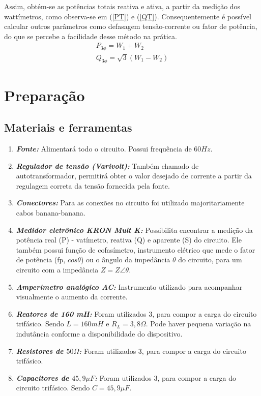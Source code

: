 \documentclass[a4paper,12pt,oneside,openany,table,xcdraw]{article}
\begin{document}
Assim, obtém-se as potências totais reativa e ativa, a partir da medição dos wattímetros, como observa-se em (\ref{PT}) e (\ref{QT}). Consequentemente é possível calcular outros parâmetros como defasagem tensão-corrente ou fator de potência, do que se percebe a facilidade desse método na prática.
\begin{gather}
P_{3\phi} = W_1 + W_2\label{PT}\\
Q_{3\phi} = \sqrt{3}(W_1 - W_2)\label{QT}
\end{gather}


\section{Preparação}
\subsection{Materiais e ferramentas} %
\begin{enumerate}[1 -]
\item \emph{\textbf{Fonte:}}
Alimentará todo o circuito. Possui frequência de $60Hz$.

\item \emph{\textbf{Regulador de tensão (Varivolt):}}
Também chamado de autotransformador, permitirá obter o valor desejado de corrente a partir da regulagem correta da tensão fornecida pela fonte.

\item \emph{\textbf{Conectores:}}
Para as conexões no circuito foi utilizado majoritariamente cabos banana-banana.

\item \emph{\textbf{Medidor eletrônico KRON Mult K:}}
Possibilita encontrar a medição da potência real (P) - vatímetro, reativa (Q) e aparente (S) do circuito. Ele também possui função de cofasímetro, instrumento elétrico que mede o fator de potência (fp, $cos\theta$) ou o ângulo da impedância $\theta$ do circuito, para um circuito com a impedância $Z = Z\angle \theta$.

\item \emph{\textbf{Amperímetro analógico AC:}}
Instrumento utilizado para acompanhar visualmente o aumento da corrente.

\item \emph{\textbf{Reatores de 160 mH:}}
Foram utilizados 3, para compor a carga do circuito trifásico. Sendo $L=160mH$ e $R_L=3,8\Omega$. Pode haver pequena variação na indutância conforme a disponibilidade do dispositivo.

\item \emph{\textbf{Resistores de $50\Omega$:}}
Foram utilizados 3, para compor a carga do circuito trifásico.

\item \emph{\textbf{Capacitores de $45,9\mu F$:}}
Foram utilizados 3, para compor a carga do circuito trifásico. Sendo $C= 45,9\mu F$.

\end{enumerate}
\end{document}
